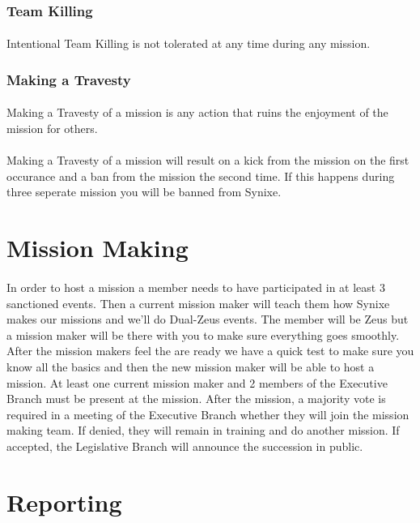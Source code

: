\documentclass[10pt,a4paper]{article}
\begin{document}
\subsubsection{Team Killing}
\paragraph{}
Intentional Team Killing is not tolerated at any time during any mission.
\subsubsection{Making a Travesty}
\paragraph{}
Making a Travesty of a mission is any action that ruins the enjoyment of the mission for others.
\paragraph{}
Making a Travesty of a mission will result on a kick from the mission on the first occurance and a ban from the mission the second time. If this happens during three seperate mission you will be banned from Synixe.
\section{Mission Making}
\paragraph{}
In order to host a mission a member needs to have participated in at least 3 sanctioned events. Then a current mission maker will teach them how Synixe makes our missions and we'll do Dual-Zeus events. The member will be Zeus but a mission maker will be there with you to make sure everything goes smoothly. After the mission makers feel the are ready we have a quick test to make sure you know all the basics and then the new mission maker will be able to host a mission. At least one current mission maker and 2 members of the Executive Branch must be present at the mission. After the mission, a majority vote is required in a meeting of the Executive Branch whether they will join the mission making team. If denied, they will remain in training and do another mission. If accepted, the Legislative Branch will announce the succession in public.
\section{Reporting}
\end{document}
